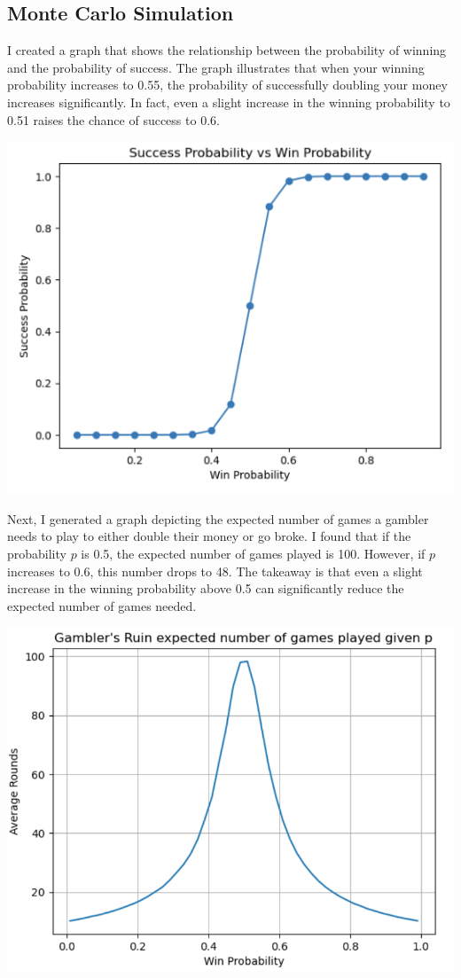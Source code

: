 \documentclass{article}
\begin{document}
\subsection{Monte Carlo Simulation}
I created a graph that shows the relationship between the probability of winning and the probability of success. The graph illustrates that when your winning probability increases to 0.55, the probability of successfully doubling your money increases significantly. In fact, even a slight increase in the winning probability to 0.51 raises the chance of success to 0.6.
\begin{center}
    \includegraphics[scale=1]{p1.png}    
\end{center}

Next, I generated a graph depicting the expected number of games a gambler needs to play to either double their money or go broke. I found that if the probability \(p\) is 0.5, the expected number of games played is 100. However, if \(p\) increases to 0.6, this number drops to 48. The takeaway is that even a slight increase in the winning probability above 0.5 can significantly reduce the expected number of games needed.

\begin{center}
    \includegraphics[scale=1]{p2.png}    
\end{center}
\end{document}
